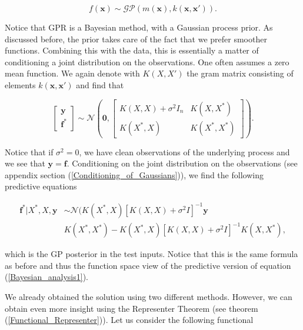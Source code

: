 \documentclass[12pt,a4paper,oneside]{book}
\begin{document}
\begin{equation}
f(\bm{x}) \sim \mathcal{GP}(m(\bm{x}),k(\bm{x},\bm{x}')).
\end{equation}

Notice that GPR is a Bayesian method, with a Gaussian process prior. As discussed before, the prior takes care of the fact that we prefer smoother functions. Combining this with the data, this is essentially a matter of conditioning a joint distribution on the observations. One often assumes a zero mean function.  We again denote with $K(X,X')$ the gram matrix consisting of elements $k(\bm{x},\bm{x}')$ and find that
 
\begin{equation}\label{condition_gpr}
\begin{bmatrix}
    \bm{y}  \\
    \bm{f^{\ast}}
\end{bmatrix}
\sim 
\mathcal{N} \left( \bm{0}, 
\begin{bmatrix}
    K(X,X) + \sigma^2 I_n & K(X,X^{\ast})\\
    K(X^{\ast},X)  & K(X^{\ast},X^{\ast})
\end{bmatrix} 
\right).
\end{equation} 

Notice that if $\sigma^2 = 0$, we have clean observations of the underlying process and we see that $\bm{y} = \bm{f}$. Conditioning on the joint distribution on the observations (see appendix section (\ref{Conditioning_of_Gaussians})), we find the following predictive equations 

\begin{equation}\label{function_1_gpr}
\boxed{\begin{aligned}
\bm{f^{\ast}} | X^{\ast}, X, \bm{y} &\sim \mathcal{N} (   K(X^{\ast},X)[K(X,X) + \sigma^2 I]^{-1} \bm{y} \\  
& K(X^{\ast}, X^{\ast}) - K(X^{\ast},X)  [K(X,X) + \sigma^2 I]^{-1}  K(X,X^{\ast} ),
\end{aligned}}
\end{equation}

which is the GP posterior in the test inputs. Notice that this is the same formula as before and thus the function space view of the predictive version of equation (\ref{Bayesian_analysis1}).


We already obtained the solution using two different methods. However, we can obtain even more insight using the Representer Theorem (see theorem (\ref{Functional_Representer})). Let us consider the following functional 
\end{document}
